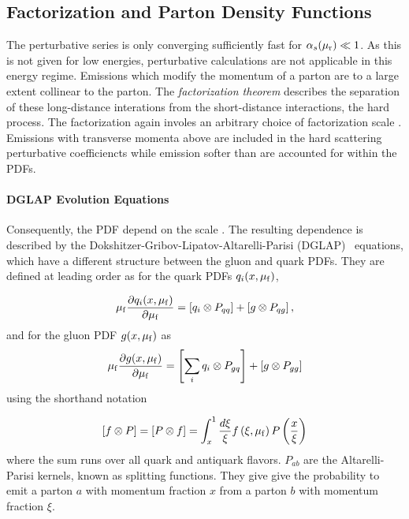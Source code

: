 \subsection{Factorization and Parton Density Functions}
\label{sec:factorization}

The perturbative series is only converging sufficiently fast for $\alpha_{s}(\mu_{\mathrm{r}}) \ll
1$. As this is not given for low energies, perturbative calculations are not
applicable in this energy regime. Emissions which modify the momentum of a
parton are to a large extent collinear to the parton. The \emph{factorization
theorem} describes the separation of these long-distance interations from the
short-distance interactions, the hard process. The factorization again involes
an arbitrary choice of factorization scale \muf. Emissions with transverse
momenta above \muf are included in the hard scattering perturbative
coefficiencts while emission softer than \muf are accounted for within the PDFs.

\paragraph{DGLAP Evolution Equations}

Consequently, the PDF depend on the scale \muf. The resulting \muf dependence is
described by the Dokshitzer-Gribov-Lipatov-Altarelli-Parisi
(DGLAP)~\cite{Gribov:1972ri,Altarelli:1977zs,Dokshitzer:1977sg} equations, which
have a different structure between the gluon and quark PDFs. They are defined at
leading order as for the quark PDFs $q_i(x, \mu_{\mathrm{f}})$,

\begin{equation*}
    \mu_{\mathrm{f}} \frac{\partial q_i (x, \mu_{\mathrm{f}})}{\partial \mu_{\mathrm{f}}} = \left[ q_i \otimes P_{qq}
    \right] + \left[ g \otimes P_{qg} \right],
\end{equation*}
%
and for the gluon PDF $g(x, \mu_{\mathrm{f}})$ as
%
\begin{equation*}
    \mu_{\mathrm{f}} \frac{\partial g (x, \mu_{\mathrm{f}})}{\partial \mu_{\mathrm{f}}} = \left[\sum_i  q_i \otimes P_{gq}
    \right] + \left[g \otimes P_{gg}\right]
\end{equation*}
%
using the shorthand notation

\begin{equation*}
    \left[f \otimes P \right] = \left[ P \otimes f \right] = \int_x^1 \frac{d
    \xi}{\xi} f\left(\xi, \mu_{\mathrm{f}}\right) P\left( \frac{x}{\xi} \right)
\end{equation*}
%
where the sum runs over all quark and antiquark flavors. $P_{ab}$ are
the Altarelli-Parisi kernels, known as splitting functions. They give give the
probability to emit a parton $a$ with momentum fraction $x$ from a parton $b$
with momentum fraction $\xi$.

